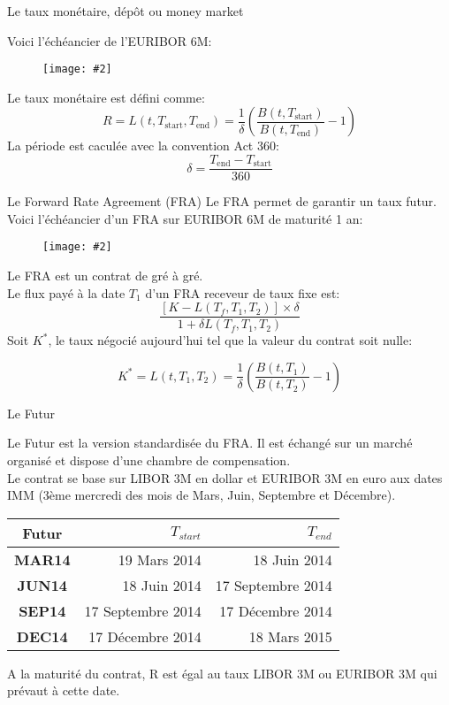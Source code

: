 \documentclass{beamer}
\newcommand{\FIG}[2]{\texttt{[image: \#2]}}
\begin{document}
\begin{frame}{Le taux monétaire, dépôt ou money market}

Voici l'échéancier de l'EURIBOR 6M:
\begin{figure}[h]
\vspace{2mm}
\FIG{7cm}{figures/schema_euribor.jpg} 
\vspace{1mm}
\end{figure}
Le taux monétaire est défini comme:
\[
R=L(t,T_\text{start}, T_\text{end})=\frac{1}{\delta}\left(\frac{B(t,T_\text{start})}{B(t,T_\text{end})}-1\right)
\]
La période est caculée avec la convention Act 360:
\[
\delta = \frac{T_\text{end} - T_\text{start}} {360}
\]
\end{frame}

\begin{frame}{Le Forward Rate Agreement (FRA)}
Le FRA permet de garantir un taux futur.\\
Voici l'échéancier d'un FRA sur EURIBOR 6M de maturité 1 an:
\begin{figure}[h]
\FIG{7cm}{figures/schema_fra.jpg} 
\end{figure}
Le FRA est un contrat de gré à gré.\\
Le flux payé à la date $T_1$ d'un FRA receveur de taux fixe est:
\[
\frac{[K-L(T_f,T_1,T_2)]\times\delta}{1+\delta L(T_f,T_1,T_2)}
\]
Soit $K^*$, le taux négocié aujourd'hui tel que la valeur du contrat soit nulle:

\[
K^*=L(t,T_1, T_2)=\frac{1}{\delta}\left(\frac{B(t,T_1)}{B(t,T_2)}-1\right)
\]
\end{frame}

\begin{frame}{Le Futur}

Le Futur est la version standardisée du FRA. Il est échangé sur un marché organisé et dispose d'une chambre de compensation.\\
Le contrat se base sur LIBOR 3M en dollar et EURIBOR 3M en euro aux dates IMM (3ème mercredi des mois de Mars, Juin, Septembre et Décembre).\\
\begin{center}
\begin{tabular}{|c|r|r|}
  \hline
  \textbf{Futur} & \textbf{$T_{start}$} & \textbf{$T_{end}$} \\
  \hline
  \textbf{MAR14} & 19 Mars 2014 & 18 Juin 2014 \\
  \textbf{JUN14} & 18 Juin 2014 & 17 Septembre 2014 \\
  \textbf{SEP14} & 17 Septembre 2014 & 17 Décembre 2014 \\
  \textbf{DEC14} & 17 Décembre 2014 &  18 Mars 2015 \\
  \hline
\end{tabular}
\end{center}
A la maturité du contrat, R est égal au taux LIBOR 3M ou EURIBOR 3M qui prévaut à cette date.
\end{frame}
\end{document}
